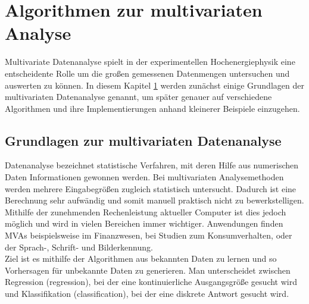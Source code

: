 \chapter{Algorithmen zur multivariaten Analyse}
\label{ch:algorithmen}

{}

Multivariate Datenanalyse spielt in der experimentellen Hochenergiephysik eine entscheidente Rolle um die gro\ss en gemessenen Datenmengen untersuchen und auswerten zu k\"onnen. In diesem Kapitel \ref{ch:algorithmen} werden zun\"achst einige Grundlagen der multivariaten Datenanalyse genannt, um sp\"ater genauer auf verschiedene Algorithmen und ihre Implementierungen anhand kleinerer Beispiele einzugehen.

\section{Grundlagen zur multivariaten Datenanalyse}
\label{ch:Theorie:sec:Algorithmen}

Datenanalyse bezeichnet statistische Verfahren, mit deren Hilfe aus numerischen Daten Informationen gewonnen werden.
Bei multivariaten Analysemethoden werden mehrere Eingabegr\"o\ss en zugleich statistisch untersucht. Dadurch ist eine Berechnung sehr aufw\"andig und somit manuell praktisch nicht zu bewerkstelligen. Mithilfe der zunehmenden Rechenleistung aktueller Computer ist dies jedoch m\"oglich und wird in vielen Bereichen immer wichtiger. Anwendungen finden MVAs beispielsweise im Finanzwesen, bei Studien zum Konsumverhalten, oder der Sprach-, Schrift- und Bilderkennung.\\
Ziel ist es mithilfe der Algorithmen aus bekannten Daten zu lernen und so Vorhersagen f\"ur unbekannte Daten zu generieren.
Man unterscheidet zwischen Regression (regression), bei der eine kontinuierliche Ausgangsgr\"o\ss e gesucht wird und Klassifikation (classification), bei der eine diskrete Antwort gesucht wird\cite{SWB-455193959}.

